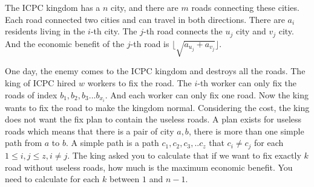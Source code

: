 The ICPC kingdom has a $n$ city, and there are $m$ roads connecting these cities. 
Each road connected two cities and can travel in both directions. 
There are $a_i$ residents living in the $i$-th city.
The $j$-th road connects the $u_j$ city and $v_j$ city. 
And the economic benefit of the $j$-th road is $\lfloor\sqrt{a_{u_j}+a_{v_j}}\rfloor$.

One day, the enemy comes to the ICPC kingdom and destroys all the roads.
The king of ICPC hired $w$ workers to fix the road.
The $i$-th worker can only fix the roads of index $b_1,b_2,b_3...b_{x_i}$.
And each worker can only fix one road.
Now the king wants to fix the road to make the kingdom normal.
Considering the cost, the king does not want the fix plan to contain the useless roads.
A plan exists for useless roads which means that there is a pair of city $a,b$,
there is more than one simple path from $a$ to $b$.
A simple path is a path $c_1,c_2,c_3,..c_z$ that $c_i \neq c_j$ for each $1\leq i,j \leq z,i\neq j$.
The king asked you to calculate that if we want to fix exactly $k$ road without useless roads, how much is the maximum economic benefit.
You need to calculate for each $k$ between $1$ and $n-1$.
